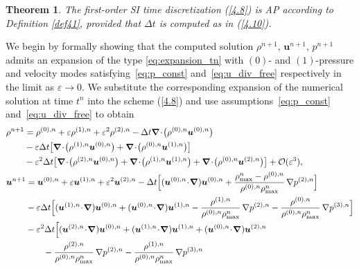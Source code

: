 \documentclass[A4paper,12pt,twoside]{article}
\newtheorem{theorem}{Theorem}[section]
\newenvironment{proof}{{\flushleft \bf Proof:}}{}
\numberwithin{equation}{section}
\numberwithin{figure}{section}
\numberwithin{table}{section}
\def\bnabla{\bm{\nabla}}
\newcommand{\dt}{\Delta t}
\newcommand{\ve}{\varepsilon}
\newcommand\eref[1]{(\ref{#1})}
\newcommand*\xbar[1]{%
  \hbox{%
    \vbox{%
      \hrule height 0.5pt %
      \kern0.4ex%
      \hbox{%
        \kern-0.05em%
        \ensuremath{#1}%
        \kern-0.00em%
      }%
    }%
  }%
}
\newcommand{\lore}[1]{{\leavevmode\color{red} #1}}
\begin{document}
\begin{theorem}\label{thm31}
The first-order SI time discretization \eref{4.8} is AP according to Definition \ref{def41}, provided that $\dt$ is computed \lore{as in} %
\eref{4.10}.
\end{theorem}
\begin{proof}
We begin by formally showing that the computed solution $\rho^{n+1}$, $\bm u^{n+1}$, $p^{n+1}$ admits an expansion of the type \eqref{eq:expansion_tn} \lore{with $(0)$- and $(1)$-pressure and velocity modes satisfying~\eqref{eq:p_const} and~\eqref{eq:u_div_free} respectively}
in the limit as $\ve\to0$. 
We substitute the corresponding expansion of the numerical solution at time $t^n$ into the scheme \eref{4.8} and use \lore{assumptions~\eqref{eq:p_const} and~\eqref{eq:u_div_free}} to obtain
\begin{align}
	&\begin{aligned}
	\rho^{n+1}&=\rho^{(0),n}+\ve \rho^{(1),n}+\ve^2 \rho^{(2),n}-\dt\bnabla\!\cdot\!\big(\rho^{(0),n}\bm u^{(0),n}\big)\\
	&-\ve \dt \big[\bnabla\!\cdot\!\big(\rho^{(1),n}\bm u^{(0),n}\big)+\bnabla\!\cdot\!\big(\rho^{(0),n}\bm u^{(1),n}\big)\big]\\
	&-\ve^2 \dt \big[\bnabla\!\cdot\!\big(\rho^{(2),n}\bm u^{(0),n}\big)+\bnabla\!\cdot\!\big(\rho^{(1),n}\bm u^{(1),n}\big)+\bnabla\!\cdot\!\big(\rho^{(0),n}\bm u^{(2),n}\big)\big]+{\cal O}(\ve^3),\label{4.11}
	\end{aligned}\\
	&\begin{aligned}
\bm u^{n+1}&=\bm u^{(0),n}+\ve \bm u^{(1),n}+\ve^2 \bm u^{(2),n}-\dt \Big[(\bm u^{(0),n}\!\cdot\!\bnabla)\bm u^{(0),n}+\frac{\rho_{\max}^n-\rho^{(0),n}}{\rho^{(0),n}\rho_{\max}^n}\,\nabla p^{(2),n} \Big]
\\&-\ve\dt \Big[(\bm u^{(1),n}\!\cdot\!\bnabla)\bm u^{(0),n}+(\bm u^{(0),n}\!\cdot\!\bnabla)\bm u^{(1),n}-\frac{\rho^{(1),n}}{\rho^{(0),n}\rho_{\max}^n}\,\nabla p^{(2),n}-\frac{\rho^{(0),n}}{\rho^{(0),n}\rho_{\max}^n}\,\nabla p^{(3),n}\Big]\\
&-\ve^2\dt \Big[
(\bm u^{(2),n}\!\cdot\!\bnabla)\bm u^{(0),n}
+(\bm u^{(1),n}\!\cdot\!\bnabla)\bm u^{(1),n}
+(\bm u^{(0),n}\!\cdot\!\bnabla)\bm u^{(2),n} \\
&\qquad
-\frac{\rho^{(2),n}}{\rho^{(0),n}\rho_{\max}^n}\,\nabla p^{(2),n}
-\frac{\rho^{(1),n}}{\rho^{(0),n}\rho_{\max}^n}\,\nabla p^{(3),n}

\end{aligned}
\end{align}
\end{proof}
\end{document}
